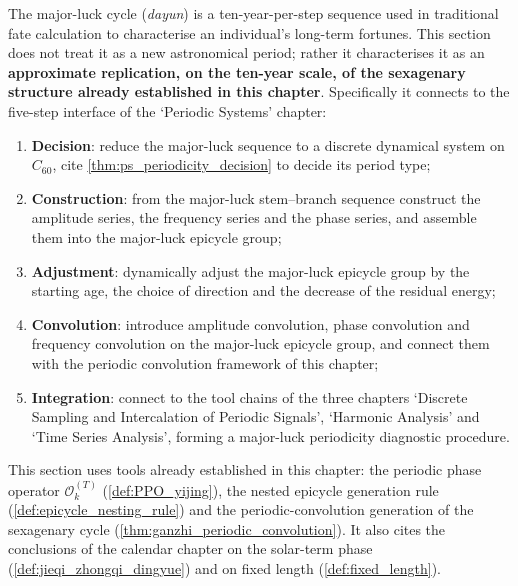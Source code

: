 \begin{remark}\label{rem:dayun_positioning_yijing}
The major-luck cycle (\textit{dayun}) is a ten-year-per-step sequence used in traditional fate calculation to characterise an individual's long-term fortunes. This section does not treat it as a new astronomical period; rather it characterises it as an \textbf{approximate replication, on the ten-year scale, of the sexagenary structure already established in this chapter}. Specifically it connects to the five-step interface of the `Periodic Systems' chapter:
\begin{enumerate}[label=(\arabic*)]
    \item \textbf{Decision}: reduce the major-luck sequence to a discrete dynamical system on $C_{60}$, cite \cref{thm:ps_periodicity_decision} to decide its period type;
    \item \textbf{Construction}: from the major-luck stem--branch sequence construct the amplitude series, the frequency series and the phase series, and assemble them into the major-luck epicycle group;
    \item \textbf{Adjustment}: dynamically adjust the major-luck epicycle group by the starting age, the choice of direction and the decrease of the residual energy;
    \item \textbf{Convolution}: introduce amplitude convolution, phase convolution and frequency convolution on the major-luck epicycle group, and connect them with the periodic convolution framework of this chapter;
    \item \textbf{Integration}: connect to the tool chains of the three chapters `Discrete Sampling and Intercalation of Periodic Signals', `Harmonic Analysis' and `Time Series Analysis', forming a major-luck periodicity diagnostic procedure.
\end{enumerate}
This section uses tools already established in this chapter: the periodic phase operator $\mathcal O_k^{(T)}$ (\cref{def:PPO_yijing}), the nested epicycle generation rule (\cref{def:epicycle_nesting_rule}) and the periodic-convolution generation of the sexagenary cycle (\cref{thm:ganzhi_periodic_convolution}). It also cites the conclusions of the calendar chapter on the solar-term phase (\cref{def:jieqi_zhongqi_dingyue}) and on fixed length (\cref{def:fixed_length}).
\end{remark}

